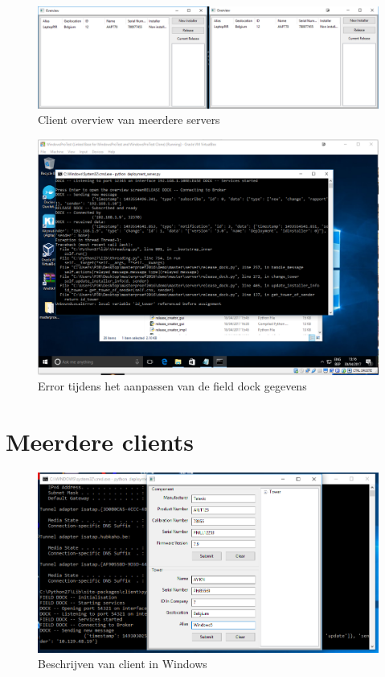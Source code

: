 \begin{figure}
\centering
\includegraphics[width=\textwidth,height=\textheight,keepaspectratio]{afbeelding/testMultiServer/twoserverview.png}
\caption{Client overview van meerdere servers}
\label{fig:testServer:overview}
\end{figure}

\begin{figure}
\centering
\includegraphics[width=\textwidth,height=\textheight,keepaspectratio]{afbeelding/testMultiServer/installatie.png}
\caption{Error tijdens het aanpassen van de field dock gegevens}
\label{fig:testServer:installation}
\end{figure}

\clearpage
\section{Meerdere clients}\label{sec:multiclientscreen}
\begin{figure}
\centering
\includegraphics[width=\textwidth,height=\textheight,keepaspectratio]{afbeelding/testMultiClient/TorenBeschrijvenWindows.png}
\caption{Beschrijven van client in Windows}
\label{fig:testClient:windowsBeschrijving}
\end{figure}

